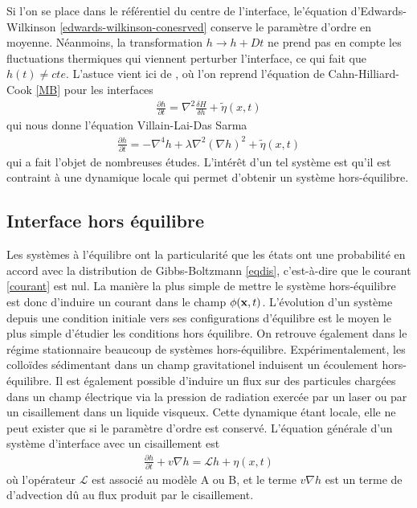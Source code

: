 Si l'on se place dans le référentiel du centre de l'interface, le'équation d'Edwards-Wilkinson \ref{edwards-wilkinson-conesrved} conserve le paramètre d'ordre en moyenne. Néanmoins, la transformation $h \rightarrow h + Dt$ ne prend pas en compte les fluctuations thermiques qui viennent perturber l'interface, ce qui fait que $h(t) \neq cte$. L'astuce vient ici de \cite{kawasaki_diffusion_1966,kawasaki_correlation-function_1966}, où l'on reprend l'équation de Cahn-Hilliard-Cook \ref{MB} pour les interfaces
\begin{align}
    \frac{\partial h}{\partial t} =  \nabla^2 \frac{\delta H}{\delta h} +  \tilde{\eta}(x,t)
\end{align}
qui nous donne l'équation Villain-Lai-Das Sarma\cite{villain_continuum_1991,lai_kinetic_1991}
\begin{align}
    \frac{\partial h}{\partial t} = - \nabla^4 h + \lambda \nabla^2 (\nabla h) ^2 +  \tilde{\eta}(x,t)
\end{align}
qui a fait l'objet de nombreuses études\cite{kim_conserved_1994,assis_dynamic_2015,oliveira_maximal-_2008,singha_renormalization_2016}.
L'intérêt d'un tel système est qu'il est contraint à une dynamique locale qui permet d'obtenir un système hors-équilibre. 

    \subsection{Interface hors équilibre}

Les systèmes à l'équilibre ont la particularité que les états ont une probabilité en accord avec la distribution de Gibbs-Boltzmann \ref{eqdis}, c'est-à-dire que le courant \ref{courant} est nul. La manière la plus simple de mettre le système hors-équilibre est donc d'induire un courant dans le champ $\phi({\bf x},t)$. L'évolution d'un système depuis une condition initiale vers ses configurations d'équilibre est le moyen le plus simple d'étudier les conditions hors équilibre. On retrouve également dans le régime stationnaire beaucoup de systèmes hors-équilibre. Expérimentalement, les colloïdes sédimentant dans un champ gravitationel induisent un écoulement hors-équilibre. Il est également possible d'induire un flux sur des particules chargées dans un champ électrique via la pression de radiation exercée par un laser ou par un cisaillement dans un liquide visqueux\cite{girot_conical_2019}. Cette dynamique étant locale, elle ne peut exister que si le paramètre d'ordre est conservé. L'équation générale d'un système d'interface avec un cisaillement est\cite{bray_interface_2001-1,bray_interface_2001}
\begin{align}
     \frac{\partial h}{\partial t} + v \nabla h =  \mathcal{L} h +  \eta(x,t)
     \label{eq-cisaillement}
\end{align}
où l'opérateur $\mathcal{L}$ est associé au modèle A ou B, et le terme $v \nabla h$ est un terme de d'advection dû au flux produit par le cisaillement. 


